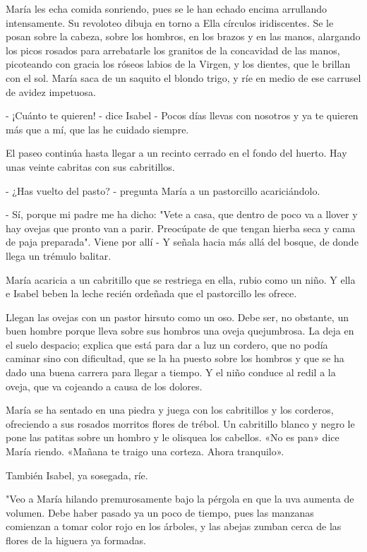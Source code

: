\documentclass[12pt]{book} %
\begin{document}
María les echa comida sonriendo, pues se le han echado encima arrullando intensamente. Su revoloteo dibuja en torno a Ella círculos iridiscentes. Se le posan sobre la cabeza, sobre los hombros, en los brazos y en las manos, alargando los picos rosados para arrebatarle los granitos de la concavidad de las manos, picoteando con gracia los róseos labios de la Virgen, y los dientes, que le brillan con el sol. María saca de un saquito el blondo trigo, y ríe en medio de ese carrusel de avidez impetuosa. 

- ¡Cuánto te quieren! - dice Isabel - Pocos días llevas con nosotros y ya te quieren más que a mí, que las he cuidado siempre. 

El paseo continúa hasta llegar a un recinto cerrado en el fondo del huerto. Hay unas veinte cabritas con sus cabritillos. 

- ¿Has vuelto del pasto? - pregunta María a un pastorcillo acariciándolo. 

- Sí, porque mi padre me ha dicho: "Vete a casa, que dentro de poco va a llover y hay ovejas que pronto van a parir. Preocúpate de que tengan hierba seca y cama de paja preparada". Viene por allí - Y señala hacia más allá del bosque, de donde llega un trémulo balitar. 

María acaricia a un cabritillo que se restriega en ella, rubio como un niño. Y ella e Isabel beben la leche recién ordeñada que el pastorcillo les ofrece. 

Llegan las ovejas con un pastor hirsuto como un oso. Debe ser, no obstante, un buen hombre porque lleva sobre sus hombros una oveja quejumbrosa. La deja en el suelo despacio; explica que está para dar a luz un cordero, que no podía caminar sino con dificultad, que se la ha puesto sobre los hombros y que se ha dado una buena carrera para llegar a tiempo. Y el niño conduce al redil a la oveja, que va cojeando a causa de los dolores. 

María se ha sentado en una piedra y juega con los cabritillos y los corderos, ofreciendo a sus rosados morritos flores de trébol. Un cabritillo blanco y negro le pone las patitas sobre un hombro y le olisquea los cabellos. «No es pan» dice María riendo. «Mañana te traigo una corteza. Ahora tranquilo». 

También Isabel, ya sosegada, ríe. 

"Veo a María hilando premurosamente bajo la pérgola en que la uva aumenta de volumen. Debe haber pasado ya un poco de tiempo, pues las manzanas comienzan a tomar color rojo en los árboles, y las abejas zumban cerca de las flores de la higuera ya formadas. 
\end{document}
